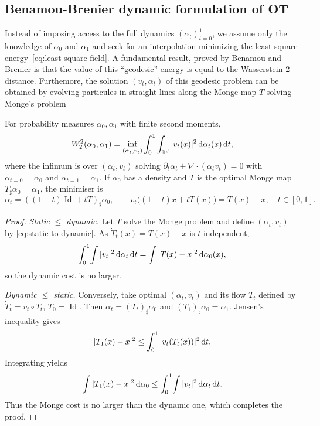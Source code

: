 \subsection{Benamou-Brenier dynamic formulation of OT}

Instead of imposing access to the full dynamics $(\alpha_t)_{t=0}^1$, we assume only the knowledge of $\alpha_0$ and $\alpha_1$ and seek for an interpolation minimizing the least square energy~\eqref{eq:least-square-field}. A fundamental result, proved by Benamou and Brenier is that the value of this ``geodesic'' energy is equal to the Wasserstein-2 distance.
%
Furthemore, the solution $(v_t,\alpha_t)$ of this geodesic problem can be obtained by evolving particules in straight lines along the Monge map $T$ solving Monge's problem

\begin{thm}
For probability measures $\alpha_0,\alpha_1$ with finite second moments,
\begin{equation}\label{eq:benamou-brenier}
  W_2^2(\alpha_0,\alpha_1)
    = \inf_{(\alpha_t,v_t)} \int_0^1 \int_{\mathbb{R}^d} |v_t(x)|^2\, \mathrm{d}\alpha_t(x)\, \mathrm{d} t,
\end{equation}
where the infimum is over $(\alpha_t,v_t)$ solving
$\partial_t\alpha_t+\nabla\!\cdot(\alpha_t v_t)=0$ with $\alpha_{t=0}=\alpha_0$ and $\alpha_{t=1}=\alpha_1$.  
If $\alpha_0$ has a density and $T$ is the optimal Monge map $T_{\sharp}\alpha_0=\alpha_1$, the minimiser is
\begin{equation}\label{eq:static-to-dynamic}
  \alpha_t=((1-t)\operatorname{Id}+tT)_{\sharp}\alpha_0,
  \qquad
  v_t\bigl((1-t)x+tT(x)\bigr)=T(x)-x,\quad t\in[0,1].
\end{equation}
\end{thm}

\begin{proof}
\textit{Static $\le$ dynamic.}  Let $T$ solve the Monge problem and define $(\alpha_t,v_t)$ by \eqref{eq:static-to-dynamic}. As $\dot T_t(x)=T(x)-x$ is $t$-independent,
\[
\int_0^1\!\int |v_t|^2\,\mathrm{d}\alpha_t\,\mathrm{d} t=\int |T(x)-x|^2\,\mathrm{d}\alpha_0(x),
\]so the dynamic cost is no larger.

\smallskip
\textit{Dynamic $\le$ static.}  Conversely, take optimal $(\alpha_t,v_t)$ and its flow $T_t$ defined by $\dot T_t=v_t\!\circ\!T_t$, $T_0=\operatorname{Id}$.  Then $\alpha_t=(T_t)_{\sharp}\alpha_0$ and $(T_1)_{\sharp}\alpha_0=\alpha_1$. Jensen's inequality gives
\[
|T_1(x)-x|^2\le\int_0^1|v_t(T_t(x))|^2\,\mathrm{d} t.
\]
Integrating yields
\[
\int|T_1(x)-x|^2\,\mathrm{d}\alpha_0\le\int_0^1\!\int|v_t|^2\,\mathrm{d}\alpha_t\,\mathrm{d} t.
\]
Thus the Monge cost is no larger than the dynamic one, which completes the proof.
\end{proof}

